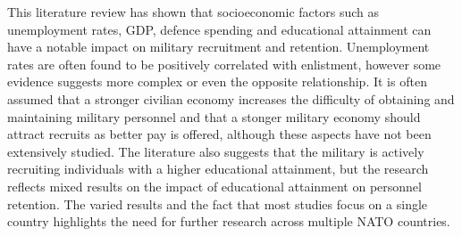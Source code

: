 This literature review has shown that socioeconomic factors such as unemployment rates, 
GDP, defence spending and educational attainment can have a notable impact on military 
recruitment and retention. Unemployment rates are often found to be positively correlated 
with enlistment, however some evidence suggests more complex or even the opposite 
relationship. It is often assumed that a stronger civilian economy increases the 
difficulty of obtaining and maintaining military personnel and that a stonger military 
economy should attract recruits as better pay is offered, although these aspects have 
not been extensively studied. The literature also suggests that the military is 
actively recruiting individuals with a higher educational attainment, but the research 
reflects mixed results on the impact of educational attainment on personnel retention. 
The varied results and the fact that most studies focus on a single country highlights 
the need for further research across multiple NATO countries.
